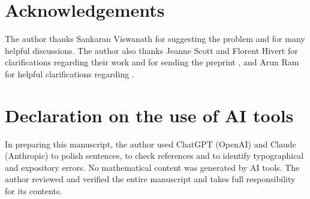 \documentclass[12pt,reqno]{amsart}
\numberwithin{equation}{section}
\theoremstyle{definition}
\theoremstyle{definition}
\begin{document}
\section*{Acknowledgements}
The author thanks Sankaran Viswanath for suggesting the problem and for many helpful discussions. The author also thanks Jeanne Scott and Florent Hivert for clarifications regarding their work and for sending the preprint \cite{HivertScott}, and Arun Ram for helpful clarifications regarding \cite{HalversonRam}.
\section*{Declaration on the use of AI tools}
In preparing this manuscript, the author used ChatGPT (OpenAI) and Claude (Anthropic) to polish sentences, to check references and to identify typographical and expository errors. No mathematical content was generated by AI tools. The author reviewed and verified the entire manuscript and takes full responsibility for its contents.


\end{document}
